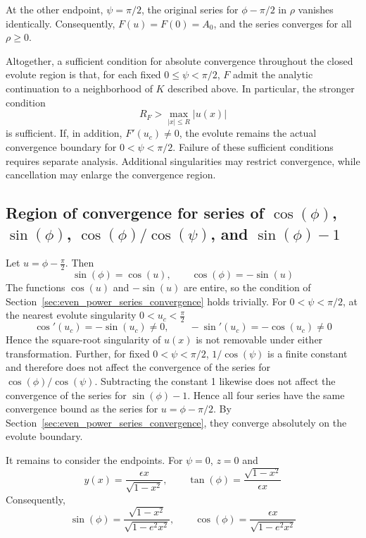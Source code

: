 \documentclass[a4paper]{amsart}
\begin{document}
At the other endpoint, $\psi=\pi/2$, the original series for $\phi-\pi/2$ in $\rho$ vanishes identically. Consequently, $F(u)=F(0)=A_0$, and the series converges for all $\rho\geq0$.

Altogether, a sufficient condition for absolute convergence throughout the closed evolute region is that, for each fixed $0\leq\psi<\pi/2$, $F$ admit the analytic continuation to a neighborhood of $K$ described above. In particular, the stronger condition
\begin{equation*}
R_F>\max_{|x|\leq R}|u(x)|
\end{equation*}
is sufficient. If, in addition, $F'(u_c)\neq0$, the evolute remains the actual convergence boundary for $0<\psi<\pi/2$. Failure of these sufficient conditions requires separate analysis. Additional singularities may restrict convergence, while cancellation may enlarge the convergence region.


\subsection{Region of convergence for series of \texorpdfstring{$\cos(\phi)$, $\sin(\phi)$, $\cos(\phi)/\cos(\psi)$, and $\sin(\phi)-1$}{cos(φ), sin(φ), cos(φ)/cos(ψ), and sin(φ) - 1}}
Let $u=\phi-\frac{\pi}{2}$. Then
\begin{equation*}
\sin(\phi)=\cos(u),
\qquad
\cos(\phi)=-\sin(u)
\end{equation*}
The functions $\cos(u)$ and $-\sin(u)$ are entire, so the condition of Section~\ref{sec:even_power_series_convergence} holds trivially.
%
For $0<\psi<\pi/2$, at the nearest evolute singularity $0<u_c<\frac{\pi}{2}$
\begin{equation*}
\cos'(u_c)=-\sin(u_c)\neq0,\qquad-\sin'(u_c)=-\cos(u_c)\neq0
\end{equation*}
Hence the square-root singularity of $u(x)$ is not removable under either transformation. Further, for fixed $0<\psi<\pi/2$, $1/\cos(\psi)$ is a finite constant and therefore does not affect the convergence of the series for $\cos(\phi)/\cos(\psi)$. Subtracting the constant 1 likewise does not affect the convergence of the series for $\sin(\phi)-1$. Hence all four series have the same convergence bound as the series for $u=\phi-\pi/2$. By Section~\ref{sec:even_power_series_convergence}, they converge absolutely on the evolute boundary.

It remains to consider the endpoints. For $\psi=0$, $z=0$ and
\begin{equation*}
y(x)=\frac{\epsilon x}{\sqrt{1-x^2}},
\qquad
\tan(\phi)=\frac{\sqrt{1-x^2}}{\epsilon x}
\end{equation*}
Consequently,
\begin{equation*}
\sin(\phi)
=
\frac{\sqrt{1-x^2}}{\sqrt{1-e^2x^2}},
\qquad
\cos(\phi)
=
\frac{\epsilon x}{\sqrt{1-e^2x^2}}
\end{equation*}
\end{document}
